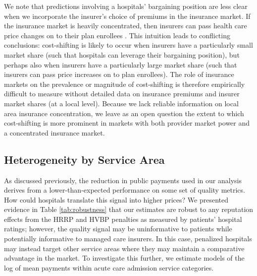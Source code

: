 \documentclass[12pt]{article}
\begin{document}
We note that predictions involving a hospitals' bargaining position are less clear when we incorporate the insurer's choice of premiums in the insurance market. If the insurance market is heavily concentrated, then insurers can pass health care price changes on to their plan enrollees \citep{trish2015,ho2017}. This intuition leads to conflicting conclusions: cost-shifting is likely to occur when insurers have a particularly small market share (such that hospitals can leverage their bargaining position), but perhaps also when insurers have a particularly large market share (such that insurers can pass price increases on to plan enrollees). The role of insurance markets on the prevalence or magnitude of cost-shifting is therefore empirically difficult to measure without detailed data on insurance premiums and insurer market shares (at a local level). Because we lack reliable information on local area insurance concentration, we leave as an open question the extent to which cost-shifting is more prominent in markets with both provider market power and a concentrated insurance market.

\subsection{Heterogeneity by Service Area}
As discussed previously, the reduction in public payments used in our analysis derives from a lower-than-expected performance on some set of quality metrics. How could hospitals translate this signal into higher prices? We presented evidence in Table \ref{tab:robustness} that our estimates are robust to any reputation effects from the HRRP and HVBP penalties as measured by patients' hospital ratings; however, the quality signal may be uninformative to patients while potentially informative to managed care insurers. In this case, penalized hospitals may instead target other service areas where they may maintain a comparative advantage in the market. To investigate this further, we estimate models of the log of mean payments within acute care admission service categories.
\end{document}
